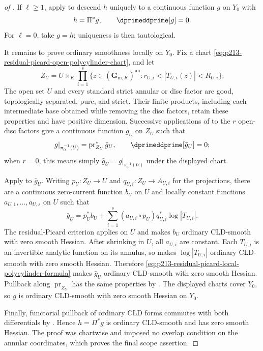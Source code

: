 \begin{proof}[of
]
If $\ell\geq1$, apply
 to descend $h$ uniquely
to a continuous function $g$ on $Y_0$ with
\[
                         h=\Pi^*g,
                         \qquad \dprimeddprime[g]=0.
\]
For $\ell=0$, take $g=h$; uniqueness is then tautological.

It remains to prove ordinary smoothness locally on $Y_0$.  Fix a chart
\eqref{eq:p213-residual-picard-open-polycylinder-chart}, and let
\[
 Z_U=U\times_K\prod_{i=1}^s
 \{z\in(\mathbf G_{\mathrm m,K})^{\mathrm{an}}:
              r_{U,i}<|T_{U,i}(z)|<R_{U,i}\}.
\]
The open set $U$ and every standard strict annular or disc factor are good,
topologically separated, pure, and strict.  Their finite products, including
each intermediate base obtained while removing the disc factors, retain
these properties and have positive dimension.
Successive applications of  to the $r$
open-disc factors give a continuous function $\bar g_U$ on $Z_U$ such that
\[
 g|_{\pi_0^{-1}(U)}=\operatorname{pr}_{Z_U}^*\bar g_U,
 \qquad \dprimeddprime[\bar g_U]=0;
\]
when $r=0$, this means simply $\bar g_U=g|_{\pi_0^{-1}(U)}$ under the
displayed chart.

Apply  to $\bar g_U$.
Writing $p_U:Z_U\to U$ and $q_{U,i}:Z_U\to A_{U,i}$ for the projections,
there are a continuous zero-current function $b_U$ on $U$ and locally
constant functions $a_{U,1},\ldots,a_{U,s}$ on $U$ such that
\begin{equation}
\label{eq:p213-residual-picard-local-polycylinder-formula}
 \bar g_U=p_U^*b_U+
 \sum_{i=1}^s(a_{U,i}\circ p_U)q_{U,i}^*\log|T_{U,i}|.
\end{equation}
The residual-Picard criterion
 applies on $U$ and makes
$b_U$ ordinary CLD-smooth with zero smooth Hessian.  After shrinking in
$U$, all $a_{U,i}$ are constant.  Each $T_{U,i}$ is an invertible analytic
function on its annulus, so  makes
$\log|T_{U,i}|$ ordinary CLD-smooth with zero smooth Hessian.  Therefore
\eqref{eq:p213-residual-picard-local-polycylinder-formula} makes
$\bar g_U$ ordinary CLD-smooth with zero smooth Hessian.  Pullback along
$\operatorname{pr}_{Z_U}$ has the same properties by
.  The displayed charts cover $Y_0$, so $g$
is ordinary CLD-smooth with zero smooth Hessian on $Y_0$.

Finally, functorial pullback of ordinary CLD forms commutes with both
differentials by .  Hence
$h=\Pi^*g$ is ordinary CLD-smooth and has zero smooth Hessian.  The proof
was chartwise and imposed no overlap condition on the annular coordinates,
which proves the final scope assertion.
\end{proof}

